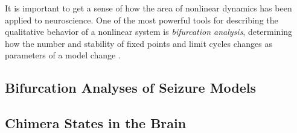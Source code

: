 It is important to get a sense of how the area of nonlinear dynamics has been applied to neuroscience.
One of the most powerful tools for describing the qualitative behavior of a nonlinear system is \textit{bifurcation analysis}, determining how the number and stability of fixed points and limit cycles changes as parameters of a model change \cite{Strogatz2015}.
\subsection{Bifurcation Analyses of Seizure Models}
\label{sec:lit_review_bifurcation}


\subsection{Chimera States in the Brain}
\label{sec:lit_review_chimera}

